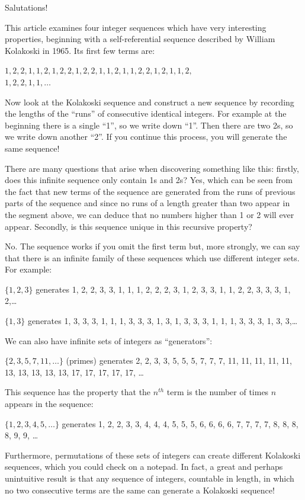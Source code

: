 Salutations!

This article examines four integer sequences which have very interesting properties, beginning with a self-referential sequence described by William Kolakoski in 1965. Its first few terms are: \par
\(1, 2, 2, 1, 1, 2, 1, 2, 2, 1, 2, 2, 1, 1, 2, 1, 1, 2, 2, 1, 2, 1, 1, 2,\)
\\
\(1, 2, 2, 1, 1,\ldots\) \par
Now look at the Kolakoski sequence and construct a new sequence by recording the lengths of the “runs” of consecutive identical integers. For example at the beginning there is a single “1”, so we write down “1”. Then there are two 2s, so we write down another “2”. If you continue this process, you will generate the same sequence! \par
There are many questions that arise when discovering something like this: firstly, does this infinite sequence only contain 1s and 2s? Yes, which can be seen from the fact that new terms of the sequence are generated from the runs of previous parts of the sequence and since no runs of a length greater than two appear in the segment above, we can deduce that no numbers higher than 1 or 2 will ever appear. Secondly, is this sequence unique in this recursive property? \par
No. The sequence works if you omit the first term but, more strongly, we can say that there is an infinite family of these sequences which use different integer sets. For example:\par

\(\{1, 2, 3\}\) generates 1, 2, 2, 3, 3, 1, 1, 1, 2, 2, 2, 3, 1, 2, 3, 3, 1, 1, 2, 2, 3, 3, 3, 1, 2,\ldots

\(\{1, 3\}\) generates 1, 3, 3, 3, 1, 1, 1, 3, 3, 3, 1, 3, 1, 3, 3, 3, 1, 1, 1, 3, 3, 3, 1, 3, 3,\ldots

We can also have infinite sets of integers as “generators”: \par

\(\{2, 3, 5, 7, 11,\ldots\}\) (primes) generates 2, 2, 3, 3, 5, 5, 5, 7, 7, 7, 11, 11, 11, 11, 11, 13, 13, 13, 13, 13, 17, 17, 17, 17, 17, \ldots

This sequence has the property that the \(n^{th}\) term is the number of times \(n\) appears in the sequence: \par
\(\{1, 2, 3, 4, 5,\ldots\}\) generates 1, 2, 2, 3, 3, 4, 4, 4, 5, 5, 5, 6, 6, 6, 6, 7, 7, 7, 7, 8, 8, 8, 8, 9, 9, \ldots

Furthermore, permutations of these sets of integers can create different Kolakoski sequences, which you could check on a notepad. In fact, a great and perhaps unintuitive result is that any sequence of integers, countable in length, in which no two consecutive terms are the same can generate a Kolakoski sequence! \par

